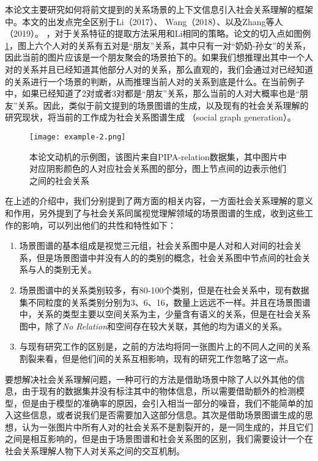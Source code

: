 本论文主要研究如何将前文提到的关系场景的上下文信息引入社会关系理解的框架中。本文的出发点完全区别于Li（2017）\cite{li2017dual-glance}、
Wang（2018）\cite{wang2018deep}、以及Zhang等人（2019）\cite{zhang2019multi}。
，对于关系特征的提取方法采用和Li\cite{li2017dual-glance}相同的策略。论文的切入点如图例\ref{fig:intro-example-2}，图上六个人对的关系有五对是``朋友''关系，其中只有一对``奶奶-孙女''的关系，因此当前的图片应该是一个朋友聚会的场景拍下的。如果我们想推理出其中一个人对的关系并且已经知道其他部分人对的关系，那么直观的，我们会通过对已经知道的关系进行一个场景的判断，从而推理当前人对的关系到底是什么。在当前例子中，如果已经知道了2对或者3对都是``朋友''关系，那么当前的人对大概率也是``朋友''关系。因此，类似于前文提到的场景图谱的生成，以及现有的社会关系理解的研究现状，将当前的工作成为社会关系图谱生成
（social graph generation）。
\begin{figure}[htpb]
	\centering
	\texttt{[image: example-2.png]}
    \caption{本论文动机的示例图，该图片来自PIPA-relation数据集，其中图片中对应阴影颜色的人对应社会关系图的部分，图上节点间的边表示他们之间的社会关系}
	\vspace*{-3.5mm}
	\label{fig:intro-example-2}
\end{figure}

在上述的介绍中，我们分别提到了两方面的相关内容，一方面社会关系理解的意义和作用，另外提到了与社会关系同属视觉理解领域的场景图谱的生成，收到这些工作的影响，可以列出他们的共性和特性如下：
\begin{enumerate}
    \item 场景图谱的基本组成是视觉三元组，社会关系图中是人对和人对间的社会关系，但是场景图谱中并没有人的的类别的概念，社会关系图中节点间的社会关系与人的类别无关。
    \item 场景图谱中的关系类别较多，有80-100个类别，但是在社会关系中，现有数据集不同粒度的关系类别分别为3、6、16，数量上远远不一样。并且在场景图谱中，关系的类型主要以空间关系为主，少量含有语义的关系，但是在社会关系图中，除了{\it No Relation}和空间存在较大关联，其他的均为语义的关系。
    \item 与现有研究工作的区别是，之前的方法均将同一张图片上的不同人之间的关系割裂来看，但是他们间的关系互相影响，现有的研究工作忽略了这一点。
\end{enumerate}

要想解决社会关系理解问题，一种可行的方法是借助场景中除了人以外其他的信息，由于现有的数据集并没有标注其中的物体信息，所以需要借助额外的检测模型，但是由于模型的准确率的原因，会引入相当一部分的噪音，我们不能简单的加入这些信息，或者说我们是否需要加入这部分信息。其次是借助场景图谱生成的思想，认为一张图片中所有人对的社会关系不是割裂开的，是一同生成的，并且它们之间是相互影响的，但是由于场景图谱和社会关系图的区别，我们需要设计一个在社会关系理解人物下人对关系之间的交互机制。

